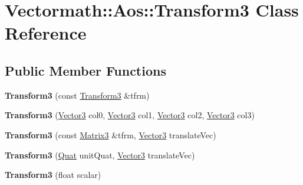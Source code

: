 \hypertarget{classVectormath_1_1Aos_1_1Transform3}{\section{Vectormath\-:\-:Aos\-:\-:Transform3 Class Reference}
\label{classVectormath_1_1Aos_1_1Transform3}
}
\subsection*{Public Member Functions}
\begin{DoxyCompactItemize}
\item 
\hypertarget{classVectormath_1_1Aos_1_1Transform3_a1b65bd72a55a4edb987e0eb8ae11c955}{{\bfseries Transform3} (const \hyperlink{classVectormath_1_1Aos_1_1Transform3}{Transform3} \&tfrm)}\label{classVectormath_1_1Aos_1_1Transform3_a1b65bd72a55a4edb987e0eb8ae11c955}

\item 
\hypertarget{classVectormath_1_1Aos_1_1Transform3_ad8d4e45affefd4e72a028cf9acee799b}{{\bfseries Transform3} (\hyperlink{classVectormath_1_1Aos_1_1Vector3}{Vector3} col0, \hyperlink{classVectormath_1_1Aos_1_1Vector3}{Vector3} col1, \hyperlink{classVectormath_1_1Aos_1_1Vector3}{Vector3} col2, \hyperlink{classVectormath_1_1Aos_1_1Vector3}{Vector3} col3)}\label{classVectormath_1_1Aos_1_1Transform3_ad8d4e45affefd4e72a028cf9acee799b}

\item 
\hypertarget{classVectormath_1_1Aos_1_1Transform3_a0d369f6be735226ed5b71c52a1548827}{{\bfseries Transform3} (const \hyperlink{classVectormath_1_1Aos_1_1Matrix3}{Matrix3} \&tfrm, \hyperlink{classVectormath_1_1Aos_1_1Vector3}{Vector3} translate\-Vec)}\label{classVectormath_1_1Aos_1_1Transform3_a0d369f6be735226ed5b71c52a1548827}

\item 
\hypertarget{classVectormath_1_1Aos_1_1Transform3_a1ebd5cc48f7014f649358468175f96fb}{{\bfseries Transform3} (\hyperlink{classVectormath_1_1Aos_1_1Quat}{Quat} unit\-Quat, \hyperlink{classVectormath_1_1Aos_1_1Vector3}{Vector3} translate\-Vec)}\label{classVectormath_1_1Aos_1_1Transform3_a1ebd5cc48f7014f649358468175f96fb}

\item 
\hypertarget{classVectormath_1_1Aos_1_1Transform3_ae587c0b9a9678eb7cfb73659886cc0c1}{{\bfseries Transform3} (float scalar)}\label{classVectormath_1_1Aos_1_1Transform3_ae587c0b9a9678eb7cfb73659886cc0c1}


\end{DoxyCompactItemize}
